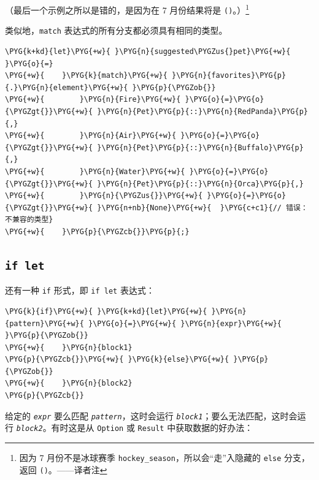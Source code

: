 （最后一个示例之所以是错的，是因为在 7 月份结果将是 \texttt{()}。）\footnote{因为 7 月份不是冰球赛季 \texttt{hockey\_season}，所以会“走”入隐藏的 \texttt{else} 分支，返回 \texttt{()}。——译者注}

类似地，\texttt{match} 表达式的所有分支都必须具有相同的类型。

\begin{Verbatim}[commandchars=\\\{\},breaklines=true,breakanywhere=true,fontsize=\codefont,xleftmargin=17bp]
\PYG{k+kd}{let}\PYG{+w}{ }\PYG{n}{suggested\PYGZus{}pet}\PYG{+w}{ }\PYG{o}{=}
\PYG{+w}{    }\PYG{k}{match}\PYG{+w}{ }\PYG{n}{favorites}\PYG{p}{.}\PYG{n}{element}\PYG{+w}{ }\PYG{p}{\PYGZob{}}
\PYG{+w}{        }\PYG{n}{Fire}\PYG{+w}{ }\PYG{o}{=}\PYG{o}{\PYGZgt{}}\PYG{+w}{ }\PYG{n}{Pet}\PYG{p}{::}\PYG{n}{RedPanda}\PYG{p}{,}
\PYG{+w}{        }\PYG{n}{Air}\PYG{+w}{ }\PYG{o}{=}\PYG{o}{\PYGZgt{}}\PYG{+w}{ }\PYG{n}{Pet}\PYG{p}{::}\PYG{n}{Buffalo}\PYG{p}{,}
\PYG{+w}{        }\PYG{n}{Water}\PYG{+w}{ }\PYG{o}{=}\PYG{o}{\PYGZgt{}}\PYG{+w}{ }\PYG{n}{Pet}\PYG{p}{::}\PYG{n}{Orca}\PYG{p}{,}
\PYG{+w}{        }\PYG{n}{\PYGZus{}}\PYG{+w}{ }\PYG{o}{=}\PYG{o}{\PYGZgt{}}\PYG{+w}{ }\PYG{n+nb}{None}\PYG{+w}{  }\PYG{c+c1}{// 错误：不兼容的类型}
\PYG{+w}{    }\PYG{p}{\PYGZcb{}}\PYG{p}{;}
\end{Verbatim}

\subsection{\texttt{if let}}

还有一种 \texttt{if} 形式，即 \texttt{if let} 表达式：

\begin{Verbatim}[commandchars=\\\{\},breaklines=true,breakanywhere=true,fontsize=\codefont,xleftmargin=17bp]
\PYG{k}{if}\PYG{+w}{ }\PYG{k+kd}{let}\PYG{+w}{ }\PYG{n}{pattern}\PYG{+w}{ }\PYG{o}{=}\PYG{+w}{ }\PYG{n}{expr}\PYG{+w}{ }\PYG{p}{\PYGZob{}}
\PYG{+w}{    }\PYG{n}{block1}
\PYG{p}{\PYGZcb{}}\PYG{+w}{ }\PYG{k}{else}\PYG{+w}{ }\PYG{p}{\PYGZob{}}
\PYG{+w}{    }\PYG{n}{block2}
\PYG{p}{\PYGZcb{}}
\end{Verbatim}

给定的 \emph{\texttt{expr}} 要么匹配 \emph{\texttt{pattern}}，这时会运行 \emph{\texttt{block1}}；要么无法匹配，这时会运行 \emph{\texttt{block2}}。有时这是从 \texttt{Option} 或 \texttt{Result} 中获取数据的好办法：

